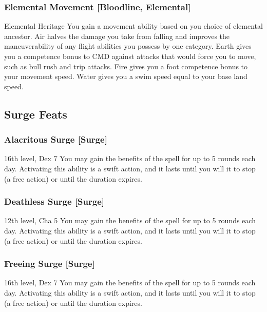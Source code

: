 \subsubsection{Elemental Movement [Bloodline, Elemental]}
\featpre Elemental Heritage
\featben You gain a movement ability based on you choice of elemental ancestor. Air halves the damage you take from falling and improves the maneuverability of any flight abilities you possess by one category. Earth gives you a  competence bonus to CMD against attacks that would force you to move, such as bull rush and trip attacks. Fire gives you a  foot competence bonus to your movement speed. Water gives you a swim speed equal to your base land speed.

\subsection{Surge Feats}

\subsubsection{Alacritous Surge [Surge]}
\featpre 16th level, Dex 7
\featben You may gain the benefits of the  spell for up to 5 rounds each day. Activating this ability is a swift action, and it lasts until you will it to stop (a free action) or until the duration expires.

\subsubsection{Deathless Surge [Surge]}
\featpre 12th level, Cha 5
\featben You may gain the benefits of the  spell for up to 5 rounds each day. Activating this ability is a swift action, and it lasts until you will it to stop (a free action) or until the duration expires.

\subsubsection{Freeing Surge [Surge]}
\featpre 16th level, Dex 7
\featben You may gain the benefits of the  spell for up to 5 rounds each day. Activating this ability is a swift action, and it lasts until you will it to stop (a free action) or until the duration expires.

